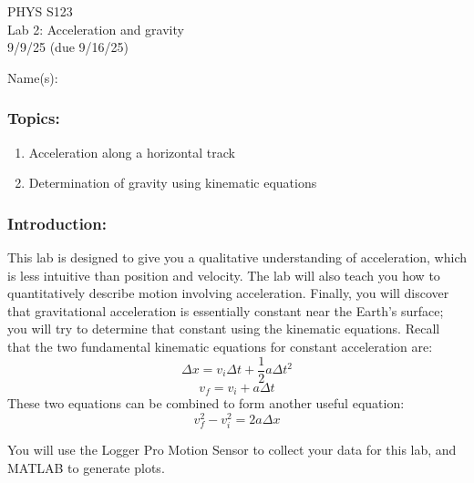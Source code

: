 \documentclass[11pt,letterpaper]{article}
\begin{document}
\setlength{\parindent}{0in}

\begin{flushright}
PHYS S123\\
Lab 2: Acceleration and gravity\\
9/9/25 (due 9/16/25)
\end{flushright}

Name(s):\\

\subsubsection*{Topics:}
\begin{enumerate}
\setlength{\parskip}{3pt}
\item Acceleration along a horizontal track
\item Determination of gravity using kinematic equations
\end{enumerate}

\subsubsection*{Introduction:}
This lab is designed to give you a qualitative understanding of acceleration, which is less intuitive than position and velocity. The lab will also teach you how to quantitatively describe motion involving acceleration. Finally, you will discover that gravitational acceleration is essentially constant near the Earth's surface; you will try to determine that constant using the kinematic equations. Recall that the two fundamental kinematic equations for constant acceleration are:
$$\Delta{x}=v_i\Delta{t}+\frac{1}{2}a\Delta{t}^2$$
$$v_f=v_i+a\Delta{t}$$
These two equations can be combined to form another useful equation:
$$v_f^2-v_i^2=2a\Delta{x}$$

You will use the Logger Pro Motion Sensor to collect your data for this lab, and MATLAB to generate plots.\\
\end{document}
